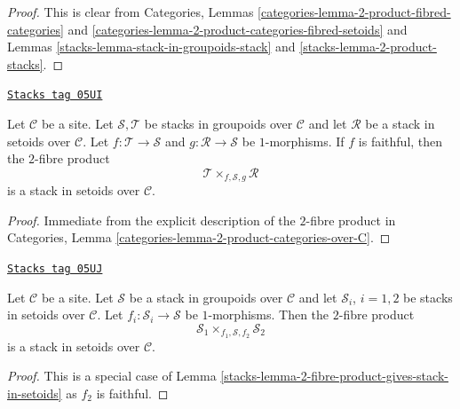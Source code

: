 \begin{proof}

This is clear from
Categories, Lemmas \ref{categories-lemma-2-product-fibred-categories} and
\ref{categories-lemma-2-product-categories-fibred-setoids}
and
Lemmas \ref{stacks-lemma-stack-in-groupoids-stack} and
\ref{stacks-lemma-2-product-stacks}.
\end{proof}

\begin{lemma}
\label{stacks-lemma-2-fibre-product-gives-stack-in-setoids}
\href{https://stacks.math.columbia.edu/tag/05UI}{\texttt{Stacks tag 05UI}}

Let $\mathcal{C}$ be a site.
Let $\mathcal{S}, \mathcal{T}$ be stacks in groupoids over $\mathcal{C}$
and let $\mathcal{R}$ be a stack in setoids over $\mathcal{C}$.
Let $f : \mathcal{T} \to \mathcal{S}$ and $g : \mathcal{R} \to \mathcal{S}$
be $1$-morphisms. If $f$ is faithful, then the $2$-fibre product
$$
\mathcal{T} \times_{f, \mathcal{S}, g} \mathcal{R}
$$
is a stack in setoids over $\mathcal{C}$.
\end{lemma}

\begin{proof}
Immediate from the explicit description of the $2$-fibre product in
Categories, Lemma \ref{categories-lemma-2-product-categories-over-C}.
\end{proof}

\begin{lemma}
\label{stacks-lemma-2-fibre-product-stacks-in-setoids-over-stack-in-groupoids}
\href{https://stacks.math.columbia.edu/tag/05UJ}{\texttt{Stacks tag 05UJ}}

Let $\mathcal{C}$ be a site.
Let $\mathcal{S}$ be a stack in groupoids over $\mathcal{C}$ and
let $\mathcal{S}_i$, $i = 1, 2$ be stacks in setoids over $\mathcal{C}$.
Let $f_i : \mathcal{S}_i \to \mathcal{S}$ be $1$-morphisms.
Then the $2$-fibre product
$$
\mathcal{S}_1 \times_{f_1, \mathcal{S}, f_2} \mathcal{S}_2
$$
is a stack in setoids over $\mathcal{C}$.
\end{lemma}

\begin{proof}

This is a special case of
Lemma \ref{stacks-lemma-2-fibre-product-gives-stack-in-setoids}
as $f_2$ is faithful.
\end{proof}

